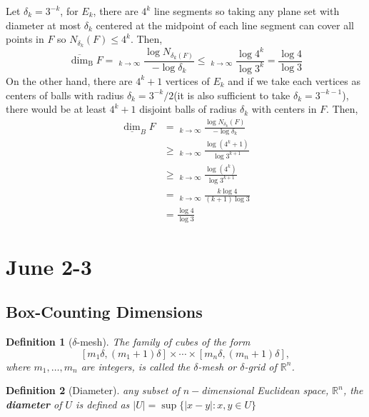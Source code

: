\documentclass[12pt, a4paper]{article}
\DeclareMathOperator*\lowlim{\underline{lim}}
\DeclareMathOperator*\uplim{\overline{lim}}
\newtheorem{definition}{Definition}[subsection]
\begin{document}
\begin{customsol}{2.5}
    Let $\delta_k = 3^{-k}$, for $E_k$, there are $4^k$ line segments so taking any plane set with diameter at most $\delta_k$ centered at the midpoint of each line segment can cover all points in $F$ so $N_{\delta_k}(F)\leq 4^k$. Then,
    $$
    \overline{\operatorname{dim}}_\mathrm{B}F = \uplim_{k\rightarrow\infty} \frac{\log N_{\delta_k(F)}}{-\log \delta_k}\leq \uplim_{k\rightarrow\infty}\frac{\log 4^k}{\log 3^k} = \frac{\log 4}{\log 3}
    $$
    On the other hand, there are $4^k+1$ vertices of $E_k$ and if we take each vertices as centers of balls with radius $\delta_k = 3^{-k}/2$(it is also sufficient to take $\delta_k = 3^{-k-1}$), there would be at least $4^k+1$ disjoint balls of radius $\delta_k$ with centers in $F$. Then,
    $$
    \begin{aligned}
        \underline{\operatorname{dim}}_{B} F &=\lowlim_{k \rightarrow \infty} \frac{\log N_{\delta_{k}}(F)}{-\log \delta_{k}} \\
        & \geq \lowlim_{k \rightarrow \infty} \frac{\log \left(4^{k}+1\right)}{\log 3^{k+1}} \\
        & \geq \lowlim_{k \rightarrow \infty} \frac{\log \left(4^{k}\right)}{\log 3^{k+1}} \\
        & = \lowlim_{k \rightarrow \infty} \frac{k \log 4}{(k+1) \log 3}\\
        & =\frac{\log 4}{\log 3}
        \end{aligned}
    $$
\end{customsol}




\newpage
\section{June 2-3}
\subsection{Box-Counting Dimensions}

\begin{definition}[$\delta$-mesh]
    The family of cubes of the form
$$
\left[m_{1} \delta,\left(m_{1}+1\right) \delta\right] \times \cdots \times\left[m_{n} \delta,\left(m_{n}+1\right) \delta\right],
$$
where $m_{1}, \ldots, m_{n}$ are integers, is called the $\delta$-mesh or $\delta$-grid of $\mathbb{R}^n$.
\end{definition}

\begin{definition}[Diameter]
    any subset of $n-$dimensional Euclidean space, $\mathbb{R}^n$, the \textbf{diameter} of $U$ is defined as $|U|=\sup \{|x-y|:x, y\in U\}$
\end{definition}
\end{document}
